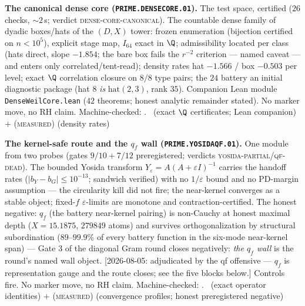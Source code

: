 \par\smallskip\noindent\textbf{The canonical dense core
(\texttt{PRIME.DENSECORE.01}).}
The test space, certified ($26$ checks, ${\sim}2$\,s; verdict
\textsc{dense-core-canonical}).  The countable dense family of
dyadic boxes/hats of the $(D,X)$ tower: frozen enumeration
(bijection certified on $n<10^5$), explicit stage map, $I_{64}$
exact in $\Q$; admissibility located per class (hats direct, slope
$-1.854$; the bare box fails the $r^{-2}$ criterion --- named
caveat --- and enters only correlated/tent-read); density rates hat
$-1.566$ / box $-0.503$ per level; exact $\Q$ correlation closure
on $8/8$ type pairs; the $24$ battery an initial diagnostic package
(hat 8 \emph{is} $\mathrm{hat}(2,3)$, rank $35$).  Companion Lean
module \texttt{DenseWeilCore.lean} ($42$ theorems; honest analytic
remainder stated).  No marker move, no RH claim.
Machine-checked: .
\mE\ (exact $\Q$ certificates; Lean companion) $+$
(\textsc{measured}) (density rates)
\par\smallskip


\par\smallskip\noindent\textbf{The kernel-safe route and the $q_f$
wall (\texttt{PRIME.YOSIDAQF.01}).}
One module from two probes (gates $9/10+7/12$ preregistered;
verdicts \textsc{yosida-partial}/\textsc{qf-dead}).  The bounded
Yosida transform $Y_\varepsilon=A(A+\varepsilon I)^{-1}$ carries
the handoff rates ($|b_Y-b_G|\le10^{-13}$; sandwich verified) with
no $1/\varepsilon$ bound and no PD-margin assumption --- the
circularity kill did not fire; the near-kernel converges as a
stable object; fixed-$f$ $\varepsilon$-limits are monotone and
contraction-certified.  The honest negative: $q_f$ (the battery
near-kernel pairing) is non-Cauchy at honest maximal depth
($X=15.1875$, $279849$ atoms) and survives orthogonalization by
structural subordination ($89$--$99.9\%$ of every battery function
in the six-mode near-kernel span) --- Gate 3 of the diagonal Gram
round closes negatively: \emph{the $q_f$ wall} is the round's
named wall object.  [2026-08-05: adjudicated by the qf offensive
--- $q_f$ is representation gauge and the route closes; see the
five blocks below.]  Controls fire.  No marker move, no RH claim.
Machine-checked: .
\mE\ (exact operator identities) $+$ (\textsc{measured})
(convergence profiles; honest preregistered negative)
\par\smallskip


